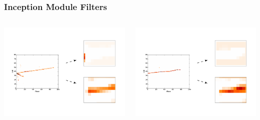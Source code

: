 \documentclass[10pt,professionalfonts,xcolor=table]{beamer}
\begin{document}
\begin{frame}
\frametitle{Inception Module Filters}

\begin{columns}[t]

\includegraphics[width=1\textwidth,viewport=10 13 170 115, clip=true]{figures/cnn/featurePlotNuMuDIS}
\gap

\includegraphics[width=1\textwidth,viewport=10 13 170 115, clip=true]{figures/cnn/featurePlotNuMuQE}



\end{columns}
\end{frame}
\end{document}
